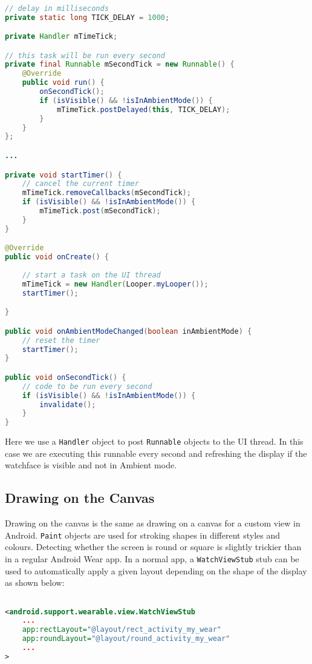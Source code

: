 \begin{lstlisting}[language=Java]

// delay in milliseconds
private static long TICK_DELAY = 1000;

private Handler mTimeTick;

// this task will be run every second
private final Runnable mSecondTick = new Runnable() {
    @Override
    public void run() {
        onSecondTick();
        if (isVisible() && !isInAmbientMode()) {
            mTimeTick.postDelayed(this, TICK_DELAY);
        }
    }
};

...

private void startTimer() {
    // cancel the current timer
    mTimeTick.removeCallbacks(mSecondTick);
    if (isVisible() && !isInAmbientMode()) {
        mTimeTick.post(mSecondTick);
    }
}

@Override
public void onCreate() {
    
    // start a task on the UI thread
    mTimeTick = new Handler(Looper.myLooper());
    startTimer();

}

public void onAmbientModeChanged(boolean inAmbientMode) {
    // reset the timer
    startTimer();
}

public void onSecondTick() {
    // code to be run every second
    if (isVisible() && !isInAmbientMode()) {
        invalidate();
    }
}

\end{lstlisting}

Here we use a \texttt{Handler} object to post \texttt{Runnable} objects to the
UI thread. In this case we are executing this runnable every second and
refreshing the display if the watchface is visible and not in Ambient mode.

\subsection{Drawing on the Canvas}

Drawing on the canvas is the same as drawing on a canvas for a custom view in
Android. \texttt{Paint} objects are used for stroking shapes in different styles
and colours. Detecting whether the screen is round or square is slightly
trickier than in a regular Android Wear app. In a normal app, a
\texttt{WatchViewStub} stub can be used to automatically apply a given layout
depending on the shape of the display as shown below:

\begin{lstlisting}[language=XML]

<android.support.wearable.view.WatchViewStub
    ...
    app:rectLayout="@layout/rect_activity_my_wear"
    app:roundLayout="@layout/round_activity_my_wear"
    ...
>

\end{lstlisting}

